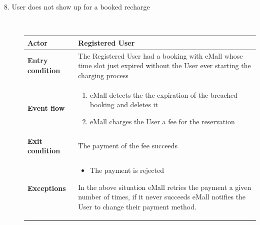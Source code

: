 \documentclass[11pt]{article}
\begin{document}
\begin{description}
    \item [8. User does not show up for a booked recharge] \hfill \\
    \begin{table}[H]
        \centering
        \setlength{\tabcolsep}{18pt}
        \renewcommand{\arraystretch}{1.4}
        \begin{tabularx}{\textwidth}{|>{\hsize=0.5\hsize}X|>{\hsize=1.5\hsize}X|}
            \hline
            \textbf{Actor} & Registered User \\
            \hline
            \textbf{Entry condition} & The Registered User had a booking with eMall whose time slot just expired without the User ever starting the charging process \\
            \hline
            \textbf{Event flow} & 
                \begin{minipage}[t]{\hsize}
                \begin{enumerate}[topsep=0pt, leftmargin=*]
                    \item eMall detects the the expiration of the breached booking and deletes it
                    \item eMall charges the User a fee for the reservation
                \end{enumerate}
                \end{minipage}
                \vspace{6pt}
            \\
            \hline
            \textbf{Exit condition} & The payment of the fee succeeds \\
            \hline
            \textbf{Exceptions} & 
                \begin{minipage}[t]{\hsize}
                \vspace{0pt}
                \begin{itemize}[topsep=0pt, leftmargin=*]
                    \item The payment is rejected
                \end{itemize}
                \vspace{8pt}
                \end{minipage}
                In the above situation eMall retries the payment a given number of times, if it never succeeds eMall notifies the User to change their payment method.
                \vspace{6pt}
            \\
            \hline
        \end{tabularx}
    \end{table}
    

\end{description}
\end{document}
